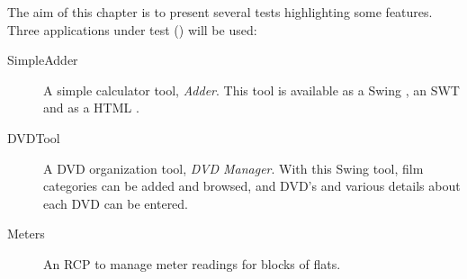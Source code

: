 
The aim of this chapter is to present several tests highlighting some features. Three applications under test (\gdauts) will be used:


\begin{description}
\item[SimpleAdder]{ A simple calculator tool, \emph{Adder}. This tool is available as a Swing \gdaut{}, an SWT \gdaut{} and as a HTML \gdaut{}. }
\item [DVDTool]{A DVD organization tool, \emph{DVD Manager}. With this Swing tool, film categories can be added and browsed, and DVD's and various details about each DVD can be entered.}  
\item [Meters]{An RCP \gdaut{} to manage meter readings for blocks of flats.}
\end{description}


